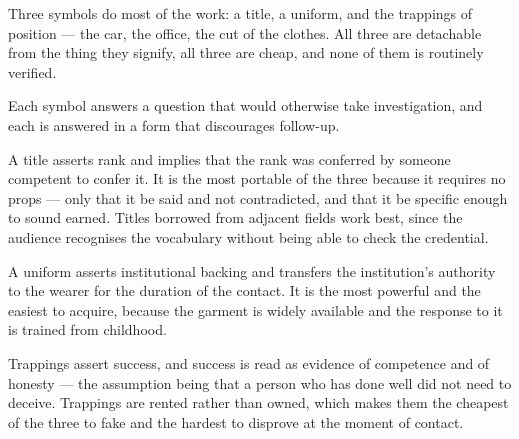 


\begin{core}
Three symbols do most of the work: a title, a uniform, and the trappings of position --- the car, the office, the cut of the clothes. All three are detachable from the thing they signify, all three are cheap, and none of them is routinely verified.
\end{core}

\begin{mechanism}
Each symbol answers a question that would otherwise take investigation, and each is answered in a form that discourages follow-up.

A title asserts rank and implies that the rank was conferred by someone competent to confer it. It is the most portable of the three because it requires no props --- only that it be said and not contradicted, and that it be specific enough to sound earned. Titles borrowed from adjacent fields work best, since the audience recognises the vocabulary without being able to check the credential.

A uniform asserts institutional backing and transfers the institution's authority to the wearer for the duration of the contact. It is the most powerful and the easiest to acquire, because the garment is widely available and the response to it is trained from childhood.

Trappings assert success, and success is read as evidence of competence and of honesty --- the assumption being that a person who has done well did not need to deceive. Trappings are rented rather than owned, which makes them the cheapest of the three to fake and the hardest to disprove at the moment of contact.
\end{mechanism}

